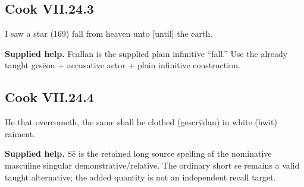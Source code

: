 \par\begin{minipage}{\linewidth}\raggedright
\subsection*{Cook VII.24.3}

I saw a star (169) fall from heaven unto [until] the earth.

\end{minipage}\par\addvspace{4pt}

\textbf{Supplied help.} Feallan is the supplied plain infinitive “fall.” Use the already taught gesēon + accusative actor + plain infinitive construction.

\par\begin{minipage}{\linewidth}\raggedright
\subsection*{Cook VII.24.4}

He that overcometh, the same shall be clothed (gescrȳdan) in white (hwīt) raiment.

\textbf{Supplied help.} Sē is the retained long source spelling of the nominative masculine singular demonstrative/\allowbreak{}relative. The ordinary short se remains a valid taught alternative; the added quantity is not an independent recall target.

\end{minipage}\par\addvspace{4pt}


